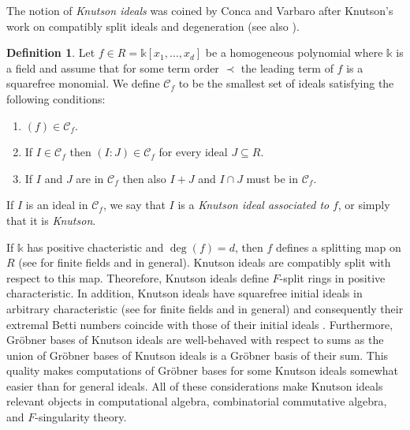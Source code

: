\documentclass[12pt]{amsart}
\theoremstyle{definition}
\newtheorem{definition}[definition]{Definition}
\newcommand{\jonathan}[1]{{\color{purple} \sf $\clubsuit$ Jonathan: [#1]}}
\renewcommand{\(}{\left(}
\renewcommand{\)}{\right)}
\newcommand{\kk}{\mathbb{k}}
\renewcommand{\!}[1]{{\color{red}\text{\Huge$\star$ }#1}}
\begin{document}
The notion of {\it Knutson ideals} was coined by  Conca and Varbaro \cite{conca2020square}  after Knutson's work on compatibly split ideals and degeneration 
\cite{knutson2009frobenius} (see also \cite{brion2007frobenius}).

\begin{definition}\label{K.I.} Let $f \in R= \kk [x_1,\ldots,x_d]$ be a homogeneous polynomial where $\kk$ is a field and assume that  for some term order $\prec$ the leading term of $f$ is a squarefree monomial. 
	We define $\mathcal{C}_f$ to be the smallest set of ideals satisfying the following conditions:
	\begin{enumerate}[(1)]
		\item $(f) \in \mathcal{C}_f$.
		\item  If $I \in \mathcal{C}_f$ then $(I:J) \in \mathcal{C}_f$ for every ideal $J \subseteq R$.
		\item If $I$ and $J$ are in $\mathcal{C}_f$ then also $I+J$ and $I \cap J$ must be in $\mathcal{C}_f$.
	\end{enumerate} 
	If $I$ is an ideal in $\mathcal{C}_f$, we say that $I$ is a \emph{Knutson ideal associated to} $f$, or simply that it is {\it Knutson}. %
\end{definition} 
If $\kk$ has positive chacteristic and $\deg(f)=d$, then $f$ defines a splitting map on $R$  (see \cite[Lemma 4]{knutson2009frobenius} for finite fields and  \cite{seccia2021knutson} in general). %
Knutson ideals are %
compatibly split with respect to this map. Theorefore,  Knutson ideals  define $F$-split %
rings in positive characteristic. In addition, Knutson ideals
have squarefree initial ideals  in arbitrary characteristic (see \cite[Theorem 2]{knutson2009frobenius} for finite fields and \cite{seccia2021knutson} in general) and consequently their extremal Betti numbers %
coincide
with  those of their initial ideals \cite{conca2020square}. Furthermore, Gr\"obner bases of Knutson ideals are well-behaved %
with respect to sums as the %
union of Gr\"obner bases of Knutson ideals is a Gr\"obner basis of their sum. This quality makes computations of Gr\"obner bases for some Knutson ideals somewhat  easier than for general ideals. %
All of  these considerations make  Knutson ideals relevant  objects %
in computational algebra, combinatorial commutative algebra, and $F$-singularity theory.  
\end{document}
